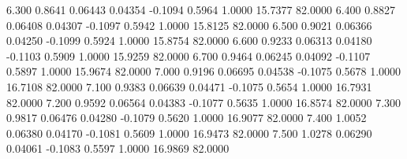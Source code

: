    6.300   0.8641   0.06443   0.04354  -0.1094   0.5964   1.0000  15.7377  82.0000
   6.400   0.8827   0.06408   0.04307  -0.1097   0.5942   1.0000  15.8125  82.0000
   6.500   0.9021   0.06366   0.04250  -0.1099   0.5924   1.0000  15.8754  82.0000
   6.600   0.9233   0.06313   0.04180  -0.1103   0.5909   1.0000  15.9259  82.0000
   6.700   0.9464   0.06245   0.04092  -0.1107   0.5897   1.0000  15.9674  82.0000
   7.000   0.9196   0.06695   0.04538  -0.1075   0.5678   1.0000  16.7108  82.0000
   7.100   0.9383   0.06639   0.04471  -0.1075   0.5654   1.0000  16.7931  82.0000
   7.200   0.9592   0.06564   0.04383  -0.1077   0.5635   1.0000  16.8574  82.0000
   7.300   0.9817   0.06476   0.04280  -0.1079   0.5620   1.0000  16.9077  82.0000
   7.400   1.0052   0.06380   0.04170  -0.1081   0.5609   1.0000  16.9473  82.0000
   7.500   1.0278   0.06290   0.04061  -0.1083   0.5597   1.0000  16.9869  82.0000
